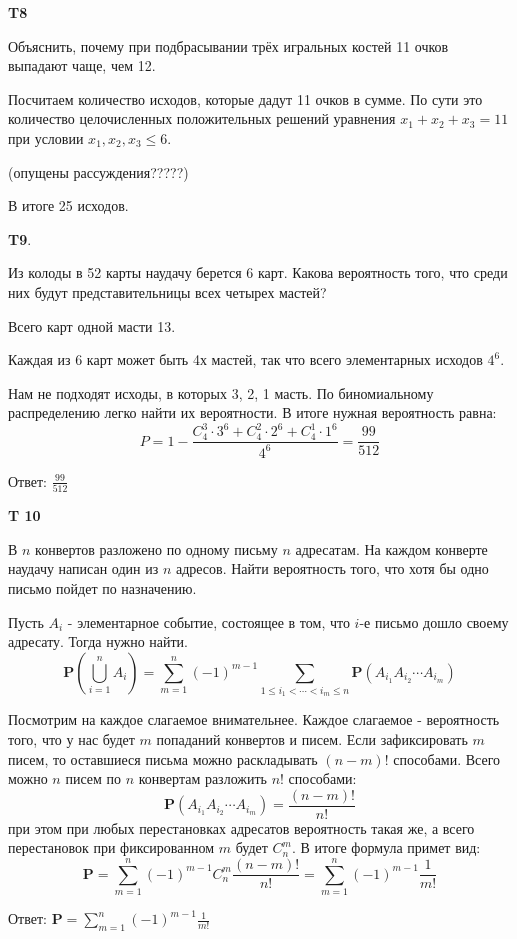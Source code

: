 \documentclass[a4paper,12pt]{article} %
\begin{document}
\begin{example}\textbf{T8}

Объяснить, почему при подбрасывании трёх игральных костей 11 очков выпадают чаще, чем 12.


Посчитаем количество исходов, которые дадут 11 очков в сумме. По сути это количество целочисленных положительных решений уравнения $ x_1+x_2+x_3=11$ при условии $ x_1,x_2,x_3\le 6$.





(опущены рассуждения?????)


В итоге 25 исходов.


\end{example}




\begin{example}\textbf{T9}. 

Из колоды в 52 карты наудачу берется 6 карт. 
Какова вероятность того, что среди них будут представительницы всех четырех мастей?

Всего карт одной масти 13.

Каждая из 6 карт может быть 4х мастей, так что всего элементарных исходов $ 4^6$.

Нам не подходят исходы, в которых 3, 2, 1 масть. По биномиальному распределению легко найти их вероятности. В итоге нужная вероятность равна:
\[ P=1-\frac{C_4^3 \cdot 3^6+C_4^2 \cdot 2^6+C_4^1 \cdot 1^6}{4^6}=\frac{99}{512} \]

Ответ: $ \frac{99}{512} $

\end{example}


\begin{example}\textbf{T 10}

В $n$ конвертов разложено по одному письму $n$ адресатам. 
На каждом конверте наудачу написан один из $n$ адресов. 
Найти вероятность того, что хотя бы одно письмо пойдет по назначению.

Пусть $ A_i$ - элементарное событие, состоящее в том, что $i$-е письмо дошло своему адресату. Тогда нужно найти.
\[ \mathbf{P}(\bigcup_{i=1}^n A_i)= \sum_{m=1}^{n}(-1)^{m-1} \sum_{1 \leqslant i_{1}<\cdots<i_{m} \leqslant n}
 \mathbf{P}\left(A_{i_{1}} A_{i_{2}} \cdots A_{i_{m}}\right) \]

Посмотрим на каждое слагаемое внимательнее. Каждое слагаемое - вероятность того, что у нас будет $m$ попаданий конвертов и писем.
Если зафиксировать $m$ писем, то оставшиеся письма можно раскладывать $(n-m)!$ способами. 
Всего можно $n$ писем по $n$ конвертам разложить $ n!$ способами:
\[ \mathbf{P}\left(A_{i_{1}} A_{i_{2}}\cdots A_{i_{m}}\right)=\frac{(n-m)!}{n!} \]
при этом при любых перестановках адресатов вероятность такая же, а всего перестановок при фиксированном $m$ будет $ C_n^m$.
В итоге формула примет вид:
\[ \mathbf{P}=\sum_{m=1}^{n}(-1)^{m-1} C_n^m \frac{(n-m)!}{n!}=
\sum_{m=1}^{n}(-1)^{m-1}\frac{1}{m!} \]

Ответ: $\mathbf{P}= \sum_{m=1}^{n}(-1)^{m-1}\frac{1}{m!} $

\end{example}
\end{document}
